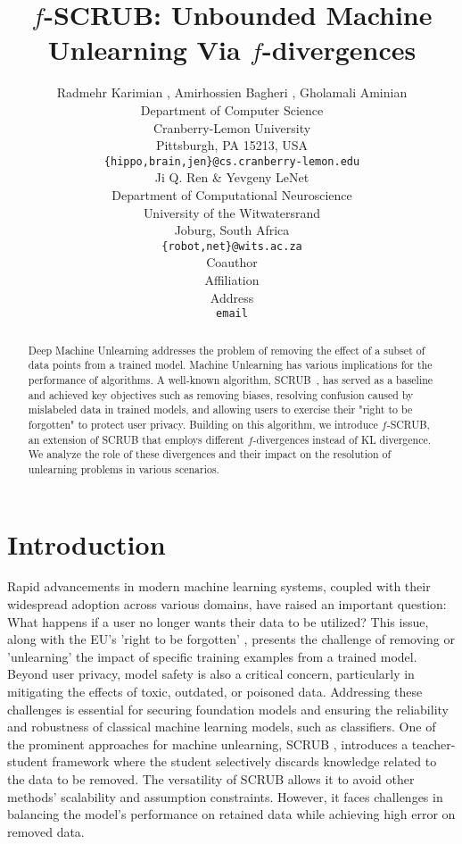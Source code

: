\documentclass{article} %
\title{$f$-SCRUB: Unbounded Machine Unlearning Via $f$-divergences}
\author{ Radmehr Karimian \textsuperscript{\textdagger}, Amirhossien Bagheri \textsuperscript{\textdagger}, Gholamali Aminian \\
Department of Computer Science\\
Cranberry-Lemon University\\
Pittsburgh, PA 15213, USA \\
\texttt{\{hippo,brain,jen\}@cs.cranberry-lemon.edu} \\
\And
Ji Q. Ren \& Yevgeny LeNet \\
Department of Computational Neuroscience \\
University of the Witwatersrand \\
Joburg, South Africa \\
\texttt{\{robot,net\}@wits.ac.za} \\
\AND
Coauthor \\
Affiliation \\
Address \\
\texttt{email}
}
\newcommand{\todoa}[2][]{\todo[size=tiny,color=blue!20!white,#1]{GA: #2}\xspace}
\begin{document}
\maketitle

\begin{abstract}
Deep Machine Unlearning addresses the problem of removing the effect of a subset of data points from a trained model. Machine Unlearning has various implications for the performance of algorithms. A well-known algorithm, SCRUB~\citep{kurmanji2023unboundedmachineunlearning}, has served as a baseline and achieved key objectives such as removing biases, resolving confusion caused by mislabeled data in trained models, and allowing users to exercise their "right to be forgotten" to protect user privacy. Building on this algorithm, we introduce $f$-SCRUB, an extension of SCRUB that employs different $f$-divergences instead of KL divergence. We analyze the role of these divergences and their impact on the resolution of unlearning problems in various scenarios.
\end{abstract}
\vspace{-0.25in}
\section{Introduction}

Rapid advancements in modern machine learning systems, coupled with their widespread adoption across various domains, have raised an important question: What happens if a user no longer wants their data to be utilized? This issue, along with the EU's 'right to be forgotten' \citep{mantelero2013eu}, presents the challenge of removing or 'unlearning' the impact of specific training examples from a trained model. Beyond user privacy, model safety is also a critical concern, particularly in mitigating the effects of toxic, outdated, or poisoned data. Addressing these challenges is essential for securing foundation models and ensuring the reliability and robustness of classical machine learning models, such as classifiers.
\newline One of the prominent approaches for machine unlearning, SCRUB \citep{kurmanji2023unboundedmachineunlearning}, introduces a teacher-student framework where the student selectively discards knowledge related to the data to be removed. The versatility of SCRUB allows it to avoid other methods' scalability and assumption constraints. However, it faces challenges in balancing the model's performance on retained data while achieving high error on removed data.
\end{document}
